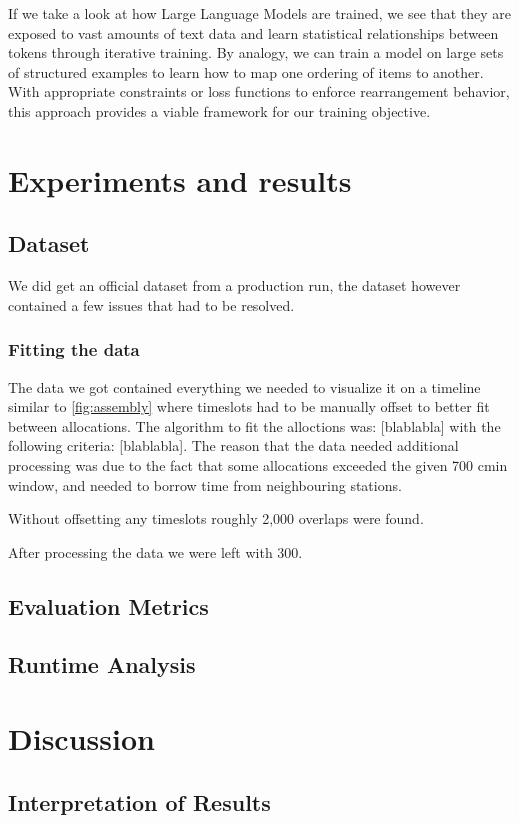 \documentclass[12pt,a4paper]{report}
\begin{document}
If we take a look at how Large Language Models are trained, we see that they are exposed to vast amounts of text data and learn statistical relationships between tokens through iterative training. By analogy, we can train a model on large sets of structured examples to learn how to map one ordering of items to another. With appropriate constraints or loss functions to enforce rearrangement behavior, this approach provides a viable framework for our training objective.



\chapter{Experiments and results}
\section{Dataset}
We did get an official dataset from a production run, the dataset however contained a few issues that had to be resolved.
\subsection{Fitting the data}
    The data we got contained everything we needed to visualize it on a timeline similar to \autoref{fig:assembly} where timeslots had to be manually offset to better fit between allocations. The algorithm to fit the alloctions was: [blablabla] with the following criteria: [blablabla]. The reason that the data needed additional processing was due to the fact that some allocations exceeded the given 700 cmin window, and needed to borrow time from neighbouring stations.

    Without offsetting any timeslots roughly 2,000 overlaps were found.
    
    After processing the data we were left with 300. %
\section{Evaluation Metrics}
\section{Runtime Analysis}

\chapter{Discussion}
\section{Interpretation of Results}
\end{document}
